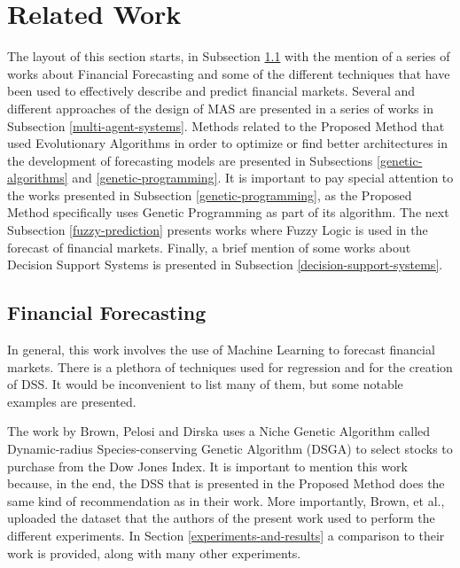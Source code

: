 \section{Related Work}
\label{related-work}

The layout of this section starts, in Subsection \ref{financial-forecasting} with the mention of a series of works about Financial Forecasting and some of the different techniques that have been used to effectively describe and predict financial markets. Several and different approaches of the design of MAS are presented in a series of works in Subsection \ref{multi-agent-systems}. Methods related to the Proposed Method that used Evolutionary Algorithms in order to optimize or find better architectures in the development of forecasting models are presented in Subsections \ref{genetic-algorithms} and \ref{genetic-programming}. It is important to pay special attention to the works presented in Subsection \ref{genetic-programming}, as the Proposed Method specifically uses Genetic Programming as part of its algorithm. The next Subsection \ref{fuzzy-prediction} presents works where Fuzzy Logic is used in the forecast of financial markets. Finally, a brief mention of some works about Decision Support Systems is presented in Subsection \ref{decision-support-systems}.

\subsection{Financial Forecasting}
\label{financial-forecasting}

In general, this work involves the use of Machine Learning to forecast financial markets. There is a plethora of techniques used for regression and for the creation of DSS. It would be inconvenient to list many of them, but some notable examples are presented.

The work by Brown, Pelosi and Dirska \cite{brown2013dynamic} uses a Niche Genetic Algorithm called Dynamic-radius Species-conserving Genetic Algorithm (DSGA) to select stocks to purchase from the Dow Jones Index. It is important to mention this work because, in the end, the DSS that is presented in the Proposed Method does the same kind of recommendation as in their work. More importantly, Brown, et al., uploaded the dataset that the authors of the present work used to perform the different experiments. In Section \ref{experiments-and-results} a comparison to their work is provided, along with many other experiments.

